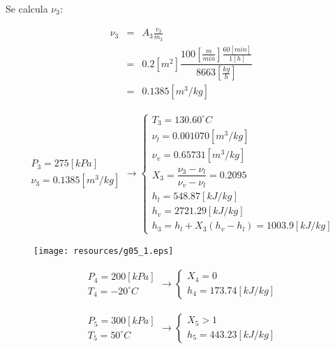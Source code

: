 \documentclass[letter,10pt]{article}
\begin{document}
\begin{enumerate}
Se calcula $\nu_3$:

\begin{eqnarray*}
    \nu_3 &=& A_3 \frac{v_3}{\dot{m}_3} \\
          &=& 0.2[m^2] \dfrac{100[\frac{m}{min}]\frac{60[min]}{1[h]}}
              {8663[\frac{kg}{h}]} \\
          &=& 0.1385[m^3/kg]
\end{eqnarray*}

\begin{eqnarray*}
    \begin{array}{c}
        P_3 = 275[kPa] \\
        \nu_3 = 0.1385[m^3/kg]
    \end{array}
    \rightarrow
    \begin{cases}
        T_3 = 130.60^\circ C \\
        \nu_l = 0.001070[m^3/kg] \\
        \nu_v = 0.65731[m^3/kg] \\
        X_3 = \dfrac{\nu_3 - \nu_l}{\nu_v - \nu_l} = 0.2095 \\
        h_l = 548.87[kJ/kg] \\
        h_v = 2721.29[kJ/kg] \\
        h_3 = h_l + X_3 (h_v - h_l) = 1003.9[kJ/kg]
    \end{cases}
\end{eqnarray*}

\begin{figure}[H]
\centering
\texttt{[image: resources/g05\_1.eps]}
\end{figure}

\begin{eqnarray*}
    \begin{array}{c}
        P_4 = 200[kPa] \\
        T_4 = -20^\circ C
    \end{array}
    \rightarrow
    \begin{cases}
        X_4 = 0 \\
        h_4 = 173.74[kJ/kg]
    \end{cases}
\end{eqnarray*}

\begin{eqnarray*}
    \begin{array}{c}
        P_5 = 300[kPa] \\
        T_5 = 50^\circ C
    \end{array}
    \rightarrow
    \begin{cases}
        X_5 > 1 \\
        h_5 = 443.23[kJ/kg]
    \end{cases}
\end{eqnarray*}


\end{enumerate}
\end{document}
